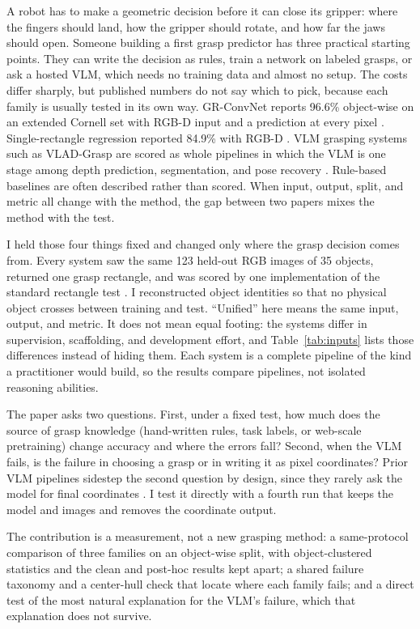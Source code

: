 \documentclass[10pt,conference,compsoc]{IEEEtran}
\begin{document}
A robot has to make a geometric decision before it can close its gripper:
where the fingers should land, how the gripper should rotate, and how far the
jaws should open. Someone building a first grasp predictor has three
practical starting points. They can write the decision as rules, train a
network on labeled grasps, or ask a hosted VLM, which needs no training data
and almost no setup. The costs differ sharply, but published numbers do not
say which to pick, because each family is usually tested in its own way.
GR-ConvNet reports 96.6\% object-wise on an extended Cornell set with
RGB-D input and a prediction at every pixel \cite{kumra2020}.
Single-rectangle regression reported 84.9\% with RGB-D \cite{redmon2015}. VLM grasping systems such as
VLAD-Grasp are scored as whole pipelines in which the VLM is one stage among
depth prediction, segmentation, and pose recovery \cite{kulshrestha2025}.
Rule-based baselines are often described rather than scored. When input,
output, split, and metric all change with the method, the gap between two
papers mixes the method with the test.

I held those four things fixed and changed only where the grasp decision
comes from. Every system saw the same 123 held-out RGB images of 35 objects,
returned one grasp rectangle, and was scored by one implementation of the
standard rectangle test \cite{jiang2011,lenz2015}. I reconstructed object
identities so that no physical object crosses between training and test.
``Unified'' here means the same input, output, and metric. It does not mean
equal footing: the systems differ in supervision, scaffolding, and
development effort, and Table~\ref{tab:inputs} lists those differences
instead of hiding them. Each system is a complete pipeline of the kind a
practitioner would build, so the results compare pipelines, not isolated
reasoning abilities.

The paper asks two questions. First, under a fixed test, how much does the
source of grasp knowledge (hand-written rules, task labels, or web-scale
pretraining) change accuracy and where the errors fall? Second, when the VLM
fails, is the failure in choosing a grasp or in writing it as pixel
coordinates? Prior VLM pipelines sidestep the second question by design, since
they rarely ask the model for final coordinates
\cite{yang2024,kulshrestha2025}. I test it directly with a fourth run that
keeps the model and images and removes the coordinate output.

The contribution is a measurement, not a new grasping method: a
same-protocol comparison of three families on an object-wise split, with
object-clustered statistics and the clean and post-hoc results kept apart; a
shared failure taxonomy and a center-hull check that locate where each family
fails; and a direct test of the most natural explanation for the VLM's
failure, which that explanation does not survive.
\end{document}
